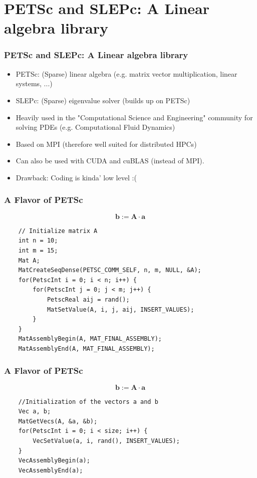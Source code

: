 \documentclass[compress]{beamer}
\begin{document}
\section{PETSc and SLEPc: A Linear algebra library}
\begin{frame}
\frametitle{PETSc and SLEPc: A Linear algebra library}
\begin{itemize}
	\item PETSc: (Sparse) linear algebra (e.g. matrix vector multiplication, linear systems, ...)
	\item SLEPc: (Sparse) eigenvalue solver (builds up on PETSc)
	\item Heavily used in the "Computational Science and Engineering" community for solving PDEs (e.g. Computational Fluid Dynamics)
	\item Based on MPI (therefore well suited for distributed HPCs)
	\item Can also be used with CUDA and cuBLAS (instead of MPI).
	\item Drawback: Coding is kinda' low level :(
\end{itemize}
\end{frame}

\begin{frame}[fragile]
\frametitle{A Flavor of PETSc}
$$
	\mathbf{b} := \mathbf{A} \cdot \mathbf{a}
$$
\begin{lstlisting}
    // Initialize matrix A
    int n = 10;
    int m = 15;
    Mat A;
    MatCreateSeqDense(PETSC_COMM_SELF, n, m, NULL, &A);
    for(PetscInt i = 0; i < n; i++) {
        for(PetscInt j = 0; j < m; j++) {
            PetscReal aij = rand();
            MatSetValue(A, i, j, aij, INSERT_VALUES);
        }
    }
    MatAssemblyBegin(A, MAT_FINAL_ASSEMBLY);
    MatAssemblyEnd(A, MAT_FINAL_ASSEMBLY);
\end{lstlisting}

\end{frame}

\begin{frame}[fragile]
\frametitle{A Flavor of PETSc}
$$
	\mathbf{b} := \mathbf{A} \cdot \mathbf{a}
$$
\begin{lstlisting}
    //Initialization of the vectors a and b
    Vec a, b;
    MatGetVecs(A, &a, &b);
    for(PetscInt i = 0; i < size; i++) {
        VecSetValue(a, i, rand(), INSERT_VALUES);
    }
    VecAssemblyBegin(a);
    VecAssemblyEnd(a);
\end{lstlisting}

\end{frame}
\end{document}
